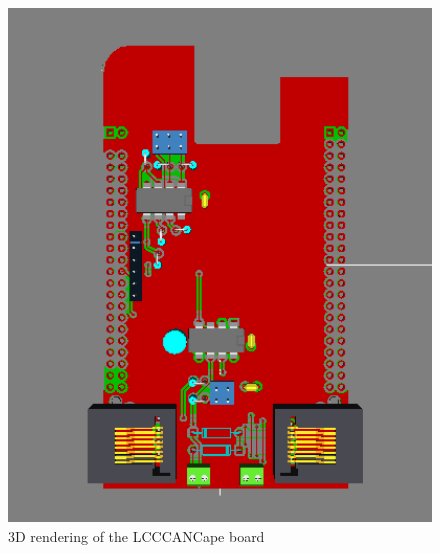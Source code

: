 \begin{figure}[hbpt]\begin{centering}%
\includegraphics[width=5in]{LCCCANCape3DTop.png}
\caption{3D rendering of the LCCCANCape board}
\end{centering}\end{figure}
